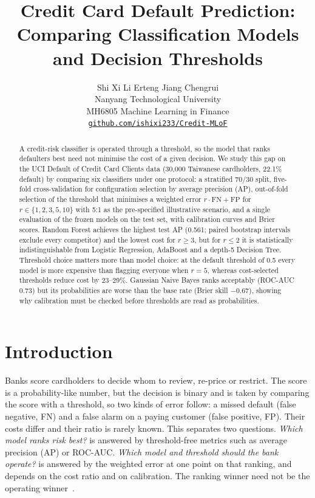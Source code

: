 \documentclass{article}
\title{Credit Card Default Prediction:\\Comparing Classification Models\\and Decision Thresholds}
\author{%
  Shi Xi \qquad Li Erteng \qquad Jiang Chengrui\\
  Nanyang Technological University\\
  MH6805 Machine Learning in Finance\\
  \texttt{\href{https://github.com/ishixi233/Credit-MLoF}{github.com/ishixi233/Credit-MLoF}}
}
\date{}
\newcommand{\FN}{\mathrm{FN}}
\newcommand{\FP}{\mathrm{FP}}
\begin{document}
\maketitle
\thispagestyle{plain}

\begin{abstract}
A credit-risk classifier is operated through a threshold, so the model that ranks defaulters best need not minimise the cost of a given decision. We study this gap on the UCI Default of Credit Card Clients data (30{,}000 Taiwanese cardholders, 22.1\% default) by comparing six classifiers under one protocol: a stratified 70/30 split, five-fold cross-validation for configuration selection by average precision (AP), out-of-fold selection of the threshold that minimises a weighted error $r\cdot\FN+\FP$ for $r\in\{1,2,3,5,10\}$ with 5:1 as the pre-specified illustrative scenario, and a single evaluation of the frozen models on the test set, with calibration curves and Brier scores. Random Forest achieves the highest test AP (0.561; paired bootstrap intervals exclude every competitor) and the lowest cost for $r\ge3$, but for $r\le2$ it is statistically indistinguishable from Logistic Regression, AdaBoost and a depth-5 Decision Tree. Threshold choice matters more than model choice: at the default threshold of 0.5 every model is more expensive than flagging everyone when $r=5$, whereas cost-selected thresholds reduce cost by 23--29\%. Gaussian Naive Bayes ranks acceptably (ROC-AUC 0.73) but its probabilities are worse than the base rate (Brier skill $-0.67$), showing why calibration must be checked before thresholds are read as probabilities.
\end{abstract}

\section{Introduction}
Banks score cardholders to decide whom to review, re-price or restrict. The score is a probability-like number, but the decision is binary and is taken by comparing the score with a threshold, so two kinds of error follow: a missed default (false negative, FN) and a false alarm on a paying customer (false positive, FP). Their costs differ and their ratio is rarely known. This separates two questions. \emph{Which model ranks risk best?} is answered by threshold-free metrics such as average precision (AP) or ROC-AUC. \emph{Which model and threshold should the bank operate?} is answered by the weighted error at one point on that ranking, and depends on the cost ratio and on calibration. The ranking winner need not be the operating winner~\citep{provost2001robust}.
\end{document}
